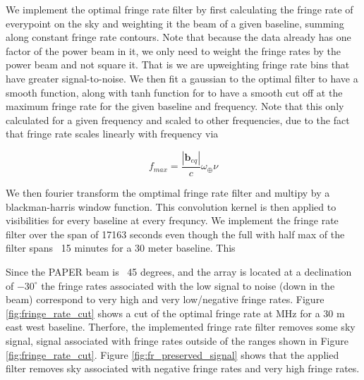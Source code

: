 \documentclass[twocolumn,numberedappendix]{emulateapj}
\begin{document}
We implement the optimal fringe rate filter by first calculating the fringe rate
of everypoint on the sky and weighting it the beam of a given baseline, summing
along constant fringe rate contours. Note that because the data already has one
factor of the power beam in it, we only need to weight the fringe rates by the
power beam and not square it. That is we are upweighting fringe rate bins that
have greater signal-to-noise.  We then fit a gaussian to the optimal filter to
have a smooth function, along with tanh function for to have a smooth cut off
at the maximum fringe rate for the given baseline and frequency.  Note that
this only calculated for a given frequency and scaled to other frequencies, due
to the fact that fringe rate scales linearly with frequency via

\begin{equation}
    f_{max} = \frac{|\mathbf{b}_{eq}|}{c}\omega_{\oplus}\nu
\end{equation}


We then fourier transform the omptimal fringe rate filter and multipy by a
blackman-harris window function. This convolution kernel is then applied to 
visibilities for every baseline at every frequncy. We implement the fringe rate
filter over the span of 17163 seconds even though the full with half max of the
filter spans ~15 minutes for a 30 meter baseline. This 

Since the PAPER beam is ~45 degrees, and the array is located at a declination
of $-30^{\circ}$ the fringe rates associated with the low signal to noise (down
in the beam) correspond to very high and very low/negative fringe rates. Figure
\ref{fig:fringe_rate_cut} shows a cut of the optimal fringe rate at MHz for a 30
m east west baseline. Therfore, the implemented fringe rate filter removes some
sky signal, signal associated with fringe rates outside of the ranges shown in
Figure \ref{fig:fringe_rate_cut}. Figure \ref{fig:fr_preserved_signal} shows
that the applied filter removes sky associated with negative fringe rates and
very high fringe rates. 
\end{document}
